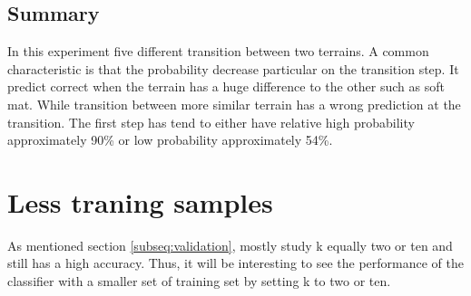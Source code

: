 \documentclass[USenglish]{ifimaster}  %
\begin{document}
\begin{table}[h]
\centering
{}
\caption{The table showing probability of each terrain per step walking from soft mat to carpet. Marked green represent correct prediction and correct terrain, red represent wrong prediction and yellow is the correct prediction if it got wrong.}
\label{tab:softcarpet}
\end{table}
\FloatBarrier
\subsection{Summary}
In this experiment five different transition between two terrains. A common characteristic is that the probability decrease particular on the transition step. It predict correct when the terrain has a huge difference to the other such as soft mat. While transition between more similar terrain has a wrong prediction at the transition. The first step has tend to either have relative high probability approximately 90\% or low probability approximately 54\%.


\section{Less traning samples}
As mentioned section \ref{subseq:validation}, mostly study k equally two or ten and still has a high accuracy. Thus, it will be interesting to see the performance of the classifier with a smaller set of training set by setting k to two or ten.
\end{document}
